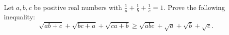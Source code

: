 Let $a,b,c$ be positive real numbers with $\frac{1}{a}+\frac{1}{b}+\frac{1}{c}=1$.
Prove the following inequality:
$$\sqrt{ab+c}+\sqrt{bc+a}+\sqrt{ca+b} \geq \sqrt{abc}+\sqrt{a}+\sqrt{b}+\sqrt{c}.$$